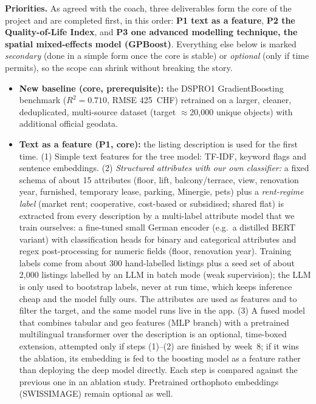 \documentclass[11pt,a4paper]{article}
\begin{document}
\textbf{Priorities.} As agreed with the coach, three deliverables form the core of the project and are completed first, in this order: \textbf{P1 text as a feature}, \textbf{P2 the Quality-of-Life Index}, and \textbf{P3 one advanced modelling technique, the spatial mixed-effects model (GPBoost)}. Everything else below is marked \emph{secondary} (done in a simple form once the core is stable) or \emph{optional} (only if time permits), so the scope can shrink without breaking the story.
\begin{itemize}
    \item \textbf{New baseline (core, prerequisite):} the DSPRO1 GradientBoosting benchmark ($R^2 = 0.710$, RMSE 425~CHF) retrained on a larger, cleaner, deduplicated, multi-source dataset (target $\approx$20{,}000 unique objects) with additional official geodata.
    \item \textbf{Text as a feature (P1, core):} the listing description is used for the first time. (1) Simple text features for the tree model: TF-IDF, keyword flags and sentence embeddings. (2) \emph{Structured attributes with our own classifier:} a fixed schema of about 15 attributes (floor, lift, balcony/terrace, view, renovation year, furnished, temporary lease, parking, Minergie, pets) plus a \emph{rent-regime label} (market rent; cooperative, cost-based or subsidised; shared flat) is extracted from every description by a multi-label attribute model that we train ourselves: a fine-tuned small German encoder (e.g.\ a distilled BERT variant) with classification heads for binary and categorical attributes and regex post-processing for numeric fields (floor, renovation year). Training labels come from about 300 hand-labelled listings plus a seed set of about 2{,}000 listings labelled by an LLM in batch mode (weak supervision); the LLM is only used to bootstrap labels, never at run time, which keeps inference cheap and the model fully ours. The attributes are used as features and to filter the target, and the same model runs live in the app. (3) A fused model that combines tabular and geo features (MLP branch) with a pretrained multilingual transformer over the description is an optional, time-boxed extension, attempted only if steps (1)--(2) are finished by week~8; if it wins the ablation, its embedding is fed to the boosting model as a feature rather than deploying the deep model directly. Each step is compared against the previous one in an ablation study. Pretrained orthophoto embeddings (SWISSIMAGE) remain optional as well.

\end{itemize}
\end{document}
